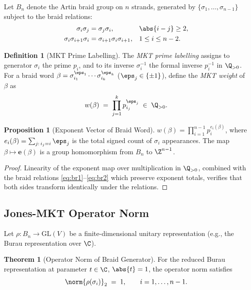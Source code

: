 \documentclass[12pt,letterpaper]{article}
\theoremstyle{definition}
\newtheorem{definition}{Definition}[section]
\newtheorem{theorem}{Theorem}[section]
\newtheorem{proposition}{Proposition}[section]
\theoremstyle{remark}
\begin{document}
Let \(B_n\) denote the Artin braid group on \(n\) strands, generated by
\(\{\sigma_1, \ldots, \sigma_{n-1}\}\) subject to the braid relations:
\begin{align}
  \sigma_i \sigma_j &= \sigma_j \sigma_i,
  && \abs{i-j} \ge 2,\label{eq:br1}\\
  \sigma_i \sigma_{i+1} \sigma_i &= \sigma_{i+1} \sigma_i \sigma_{i+1},
  && 1 \le i \le n-2.\label{eq:br2}
\end{align}

\begin{definition}[MKT Prime Labelling]
  \label{def:mkt-label}
  The \emph{MKT prime labelling} assigns to generator \(\sigma_i\) the prime
  \(p_i\), and to its inverse \(\sigma_i^{-1}\) the formal inverse
  \(p_i^{-1}\) in \(\Q_{>0}\).  For a braid word
  \(\beta = \sigma_{i_1}^{\eps_1} \cdots \sigma_{i_k}^{\eps_k}\)
  (\(\eps_j \in \{\pm 1\}\)), define the
  \emph{MKT weight} of \(\beta\) as
  \[
    w(\beta) \;=\; \prod_{j=1}^k p_{i_j}^{\eps_j} \;\in\; \Q_{>0}.
  \]
\end{definition}

\begin{proposition}[Exponent Vector of Braid Word]
  \label{prop:braid-exponent}
  \(w(\beta) = \prod_{i=1}^{n-1} p_i^{e_i(\beta)}\), where
  \(e_i(\beta) = \sum_{j:\, i_j = i} \eps_j\) is the total signed count of
  \(\sigma_i\) appearances.  The map \(\beta \mapsto \bm{e}(\beta)\) is a
  group homomorphism from \(B_n\) to \(\Z^{n-1}\).
\end{proposition}

\begin{proof}
  Linearity of the exponent map over multiplication in \(\Q_{>0}\), combined
  with the braid relations \eqref{eq:br1}--\eqref{eq:br2} which preserve
  exponent totals, verifies that both sides transform identically under the
  relations.
\end{proof}

\subsection{Jones-MKT Operator Norm}
\label{ssec:jones-norm}

Let \(\rho : B_n \to \mathrm{GL}(V)\) be a finite-dimensional unitary
representation (e.g., the Burau representation over \(\C\)).

\begin{theorem}[Operator Norm of Braid Generator]
  \label{thm:braid-norm}
  For the reduced Burau representation at parameter \(t \in \C\),
  \(\abs{t} = 1\), the operator norm satisfies
  \[
    \norm{\rho(\sigma_i)}_2 \;=\; 1, \qquad i = 1, \ldots, n-1.
  \]
\end{theorem}
\end{document}
